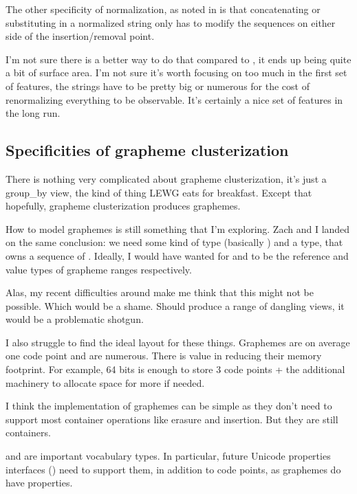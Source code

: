 \documentclass{wg21}
\begin{document}
The other specificity of normalization, as noted in  is that concatenating or substituting in a normalized string only has to modify the sequences
on either side of the insertion/removal point.

I'm not sure there is a better way to do that compared to , it ends up being quite a bit of surface area.
I'm not sure it's worth focusing on too much in the first set of features, the strings have to be pretty big or numerous for the cost of renormalizing everything to be observable. It's certainly a nice set of features in the long run.

\subsection{Specificities of grapheme clusterization}

There is nothing very complicated about grapheme clusterization, it's just a group_by view, the kind of thing LEWG eats for breakfast.
Except that hopefully, grapheme clusterization produces graphemes.

How to model graphemes is still something that I'm exploring.
Zach and I landed on the same conclusion: we need some kind of  type (basically ) and a  type, that owns a sequence of .
Ideally, I would have wanted for  and  to be the reference and value types of grapheme ranges respectively.

Alas, my recent difficulties around  make me think that this might not be possible. Which would be a shame.
Should  produce a range of dangling views, it would be a problematic shotgun.

I also struggle to find the ideal layout for these things. Graphemes are on average one code point and are numerous. There is value in reducing their memory footprint. For example, 64 bits is enough to store 3 code points + the additional machinery to allocate space for more if needed.

I think the implementation of graphemes can be simple as they don't need to support most container operations like erasure and insertion.
But they are still containers.

 and  are important vocabulary types.
In particular, future Unicode properties interfaces () need to support them, in addition to code points, as graphemes do have properties.
\end{document}
